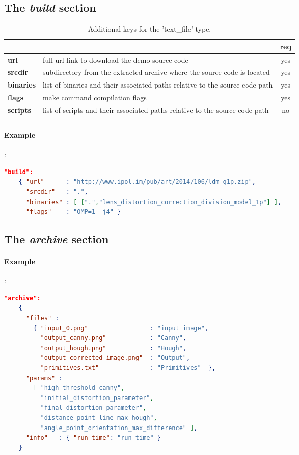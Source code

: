 \subsection{The \emph{build} section}

\begin{longtable}{|>{\bf}L{\linewidth}|L{\linewidth}|c|}
\hline
{}     &  & {\bf req} \tabularnewline 
\hline \hline
 url      & full url link to download the demo source code & yes \\ \hline
 srcdir   & subdirectory from the extracted archive where the source code is 
            located & yes \\ \hline
 binaries & list of binaries and their associated paths relative to the source 
            code path & yes \\ \hline
 flags    & make command compilation flags & yes \\ \hline
 scripts  & list of scripts and their associated paths relative to the source 
            code path & no  \\ \hline
\caption{Additional keys for the 'text\_file' type.}
\end{longtable}

\paragraph{Example}:\\
\begin{lstlisting}[language=json,firstnumber=1]
  "build":
    { "url"      : "http://www.ipol.im/pub/art/2014/106/ldm_q1p.zip", 
      "srcdir"   : ".",
      "binaries" : [ [".","lens_distortion_correction_division_model_1p"] ],
      "flags"    : "OMP=1 -j4" }
\end{lstlisting}

\subsection{The \emph{archive} section}

\paragraph{Example}:\\
\begin{lstlisting}[language=json,firstnumber=1]
  "archive":
    {
      "files" : 
        { "input_0.png"                 : "input image",
          "output_canny.png"            : "Canny",
          "output_hough.png"            : "Hough",
          "output_corrected_image.png"  : "Output",
          "primitives.txt"              : "Primitives"  },
      "params" :  
        [ "high_threshold_canny", 
          "initial_distortion_parameter", 
          "final_distortion_parameter", 
          "distance_point_line_max_hough", 
          "angle_point_orientation_max_difference" ],
      "info"   : { "run_time": "run time" }
    }
\end{lstlisting}

